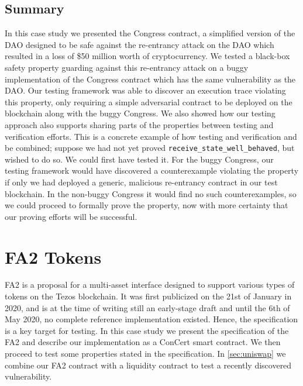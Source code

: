 \documentclass[twoside,11pt,openright]{report}
\newcommand{\coq}[1]{\texttt{#1}}
\begin{document}
\subsection{Summary}
In this case study we presented the Congress contract, a simplified version of the DAO designed to be safe against the re-entrancy attack on the DAO which resulted in a loss of \$50 million worth of cryptocurrency. We tested a black-box safety property guarding against this re-entrancy attack on a buggy implementation of the Congress contract which has the same vulnerability as the DAO. Our testing framework was able to discover an execution trace violating this property, only requiring a simple adversarial contract to be deployed on the blockchain along with the buggy Congress. 
We also showed how our testing approach also supports sharing parts of the properties between testing and verification efforts. This is a concrete example of how testing and verification and be combined; suppose we had not yet proved \coq{receive\_state\_well\_behaved}, but wished to do so. We could first have tested it. For the buggy Congress, our testing framework would have discovered a counterexample violating the property if only we had deployed a generic, malicious re-entrancy contract in our test blockchain. In the non-buggy Congress it would find no such counterexamples, so we could proceed to formally prove the property, now with more certainty that our proving efforts will be successful.

\section{FA2 Tokens}
\label{sec:fa2}
FA2 is a proposal for a multi-asset interface designed to support various types of tokens on the Tezos blockchain\cite{tzip12-fa2}. It was first publicized on the 21st of January in 2020, and is at the time of writing still an early-stage draft and until the 6th of May 2020, no complete reference implementation existed\cite{fa2-python}. Hence, the specification is a key target for testing. In this case study we present the specification of the FA2 and describe our implementation as a ConCert smart contract. We then proceed to test some properties stated in the specification. In \autoref{sec:uniswap} we combine our FA2 contract with a liquidity contract to test a recently discovered vulnerability.
\end{document}
